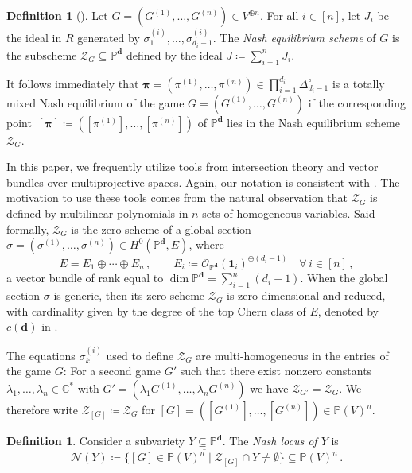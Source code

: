\documentclass[12pt]{article}
\theoremstyle{definition}
\newtheorem{definition}[theorem]{Definition}
\newcommand{\C}{{\mathbb C}}
\newcommand{\PP}{{\mathbb P}}
\def\bd{{\boldsymbol{d}}}
\def\bpi{{\boldsymbol{\pi}}}
\def\bone{{\boldsymbol{1}}}
\newcommand{\kn}{{\mathcal N}}
\newcommand{\ko}{{\mathcal O}}
\newcommand{\kz}{{\mathcal Z}}
\begin{document}
\begin{definition}[{\cite[Definition 2.6]{abo2026vector}}]\label{def: Nash equilibria scheme}
Let $G=(G^{(1)},\ldots,G^{(n)})\in V^{\oplus n}$. For all $i \in [n]$, let $J_i$ be the ideal in $R$ generated by $\sigma_1^{(i)},\ldots,\sigma_{d_i-1}^{(i)}$.
The {\em Nash equilibrium scheme} of $G$ is the subscheme $\kz_G\subseteq\PP^\bd$ defined by the ideal $J\coloneqq \sum_{i=1}^n J_i$.
\end{definition}

It follows immediately that $\bpi=(\pi^{(1)},\ldots,\pi^{(n)}) \in \prod_{i=1}^{d_i} \Delta_{d_i-1}^\circ$ is a totally mixed Nash equilibrium of the game $G=(G^{(1)},\ldots,G^{(n)})$ if the corresponding point~$[\bpi]\coloneqq([\pi^{(1)}],\ldots,[\pi^{(n)}])$ of $\PP^\bd$ lies in the Nash equilibrium scheme $\kz_G$.

\medskip

In this paper, we frequently utilize tools from intersection theory and vector bundles over multiprojective spaces. Again, our notation is consistent with \cite[Section 2.3]{abo2026vector}.
The motivation to use these tools comes from the natural observation that $\kz_G$ is defined by multilinear polynomials in $n$ sets of homogeneous variables. Said formally, $\kz_G$ is the zero scheme of a global section $\sigma=(\sigma^{(1)},\ldots,\sigma^{(n)})\in H^0(\PP^\bd,E)$, where
\begin{equation}\label{eq: def vector bundle E}
    E=E_1\oplus\cdots\oplus E_n\,,\qquad E_i\coloneqq\ko_{\PP^{\bd}}(\bone_i)^{\oplus(d_i-1)}\quad\forall\,i\in[n]\,,
\end{equation}
a vector bundle of rank equal to $\dim\PP^{\bd}=\sum_{i=1}^n(d_i-1)$. When the global section $\sigma$ is generic, then its zero scheme $\kz_G$ is zero-dimensional and reduced, with cardinality given by the degree of the top Chern class of $E$, denoted by $c(\bd)$ in \cite[Theorem 2.8]{abo2026vector}.

The equations $\sigma_k^{(i)}$ used to define $\kz_G$ are multi-homogeneous in the entries of the game $G$: For a second game $G'$ such that there exist nonzero constants $\lambda_1,\ldots,\lambda_n\in \C^*$ with $G'=(\lambda_1 G^{(1)},\ldots,\lambda_nG^{(n)})$ we have $\kz_{G'}=\kz_G$. We therefore write $\kz_{[G]}\coloneq \kz_G$ for $[G]=([G^{(1)}],\ldots,[G^{(n)}])\in \PP(V)^n$.

\begin{definition}\label{def: Nash locus}
Consider a subvariety $Y\subseteq\PP^\bd$. The {\em Nash locus of $Y$} is
\begin{equation}
    \kn(Y)\coloneqq\overline{\{[G]\in \PP(V)^n\mid \kz_{[G]}\cap Y\neq\emptyset\}}\subseteq \PP(V)^n\,.
\end{equation}
\end{definition}
\end{document}
